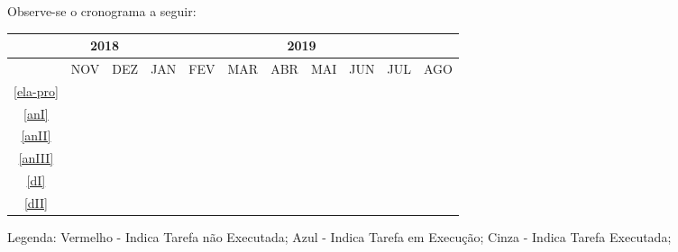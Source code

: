 Observe-se o cronograma a seguir:

\begin{table}[!htbp]
	\centering
		\begin{tabular}{|c|c|c|c|c|c|c|c|c|c|c|}
		\hline
		&\multicolumn{2}{c|}{2018}&\multicolumn{8}{c|}{2019}\\
		\hline
		&NOV&DEZ&JAN&FEV&MAR&ABR&MAI&JUN&JUL&AGO\\
		\hline
		\ref{ela-pro}&\cellcolor{midgray}&&&&&&&&&\\
		\hline
		\ref{anI}&&\cellcolor{midgray}&\cellcolor{midgray}&\cellcolor{blue}&&&&&&\\
		\hline	
		\ref{anII}&&&&&\cellcolor{red}&&&&&\\
		\hline			
		\ref{anIII}&&&&&\cellcolor{red}&\cellcolor{red}&\cellcolor{red}&&&\\
		\hline	
		\ref{dI}&&&&&&&&\cellcolor{red}&&\\
		\hline
		\ref{dII}&&&&&&&&&\cellcolor{red}&\\
		\hline	
		\end{tabular}
\end{table}

Legenda: \newline
\indent Vermelho - Indica Tarefa não Executada;\newline
\indent Azul - Indica Tarefa em Execução; \newline
\indent Cinza - Indica Tarefa Executada;\newline